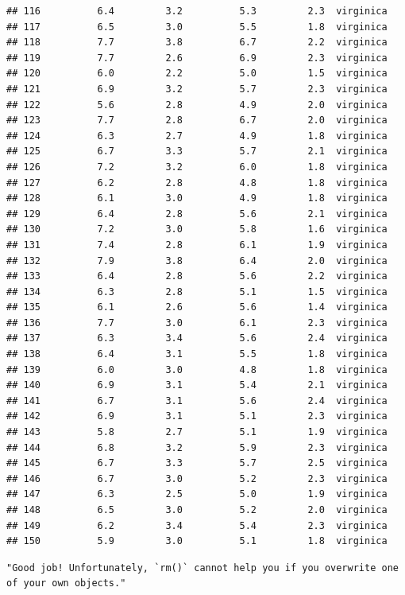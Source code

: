 \documentclass[
]{article}
\begin{document}
\begin{verbatim}
## 116          6.4         3.2          5.3         2.3  virginica
## 117          6.5         3.0          5.5         1.8  virginica
## 118          7.7         3.8          6.7         2.2  virginica
## 119          7.7         2.6          6.9         2.3  virginica
## 120          6.0         2.2          5.0         1.5  virginica
## 121          6.9         3.2          5.7         2.3  virginica
## 122          5.6         2.8          4.9         2.0  virginica
## 123          7.7         2.8          6.7         2.0  virginica
## 124          6.3         2.7          4.9         1.8  virginica
## 125          6.7         3.3          5.7         2.1  virginica
## 126          7.2         3.2          6.0         1.8  virginica
## 127          6.2         2.8          4.8         1.8  virginica
## 128          6.1         3.0          4.9         1.8  virginica
## 129          6.4         2.8          5.6         2.1  virginica
## 130          7.2         3.0          5.8         1.6  virginica
## 131          7.4         2.8          6.1         1.9  virginica
## 132          7.9         3.8          6.4         2.0  virginica
## 133          6.4         2.8          5.6         2.2  virginica
## 134          6.3         2.8          5.1         1.5  virginica
## 135          6.1         2.6          5.6         1.4  virginica
## 136          7.7         3.0          6.1         2.3  virginica
## 137          6.3         3.4          5.6         2.4  virginica
## 138          6.4         3.1          5.5         1.8  virginica
## 139          6.0         3.0          4.8         1.8  virginica
## 140          6.9         3.1          5.4         2.1  virginica
## 141          6.7         3.1          5.6         2.4  virginica
## 142          6.9         3.1          5.1         2.3  virginica
## 143          5.8         2.7          5.1         1.9  virginica
## 144          6.8         3.2          5.9         2.3  virginica
## 145          6.7         3.3          5.7         2.5  virginica
## 146          6.7         3.0          5.2         2.3  virginica
## 147          6.3         2.5          5.0         1.9  virginica
## 148          6.5         3.0          5.2         2.0  virginica
## 149          6.2         3.4          5.4         2.3  virginica
## 150          5.9         3.0          5.1         1.8  virginica
\end{verbatim}

\begin{verbatim}
"Good job! Unfortunately, `rm()` cannot help you if you overwrite one of your own objects."
\end{verbatim}
\end{document}
